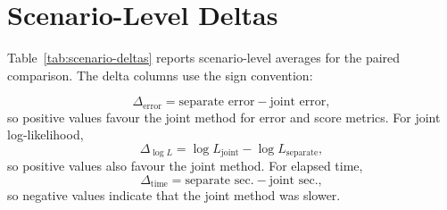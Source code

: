 \documentclass[11pt]{article}
\begin{document}
\section{Scenario-Level Deltas}

Table~\ref{tab:scenario-deltas} reports scenario-level averages for the paired
comparison.  The delta columns use the sign convention:

\[
\Delta_{\mathrm{error}} =
\text{separate error} - \text{joint error},
\]
so positive values favour the joint method for error and score metrics.  For
joint log-likelihood,
\[
\Delta_{\log L} =
\log L_{\mathrm{joint}} - \log L_{\mathrm{separate}},
\]
so positive values also favour the joint method.  For elapsed time,
\[
\Delta_{\mathrm{time}} =
\text{separate sec.} - \text{joint sec.},
\]
so negative values indicate that the joint method was slower.
\end{document}
